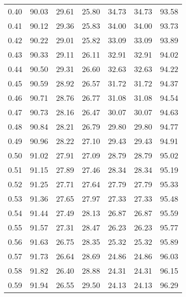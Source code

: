 \begin{tabular}{|c|c|c|c|c|c|c|}
      0.40 &     90.03 &     29.61 &      25.80 &   34.73 &      34.73 &         93.58 \\
      0.41 &     90.12 &     29.36 &      25.83 &   34.00 &      34.00 &         93.73 \\
      0.42 &     90.22 &     29.01 &      25.82 &   33.09 &      33.09 &         93.89 \\
      0.43 &     90.33 &     29.11 &      26.11 &   32.91 &      32.91 &         94.02 \\
      0.44 &     90.50 &     29.31 &      26.60 &   32.63 &      32.63 &         94.22 \\
      0.45 &     90.59 &     28.92 &      26.57 &   31.72 &      31.72 &         94.37 \\
      0.46 &     90.71 &     28.76 &      26.77 &   31.08 &      31.08 &         94.54 \\
      0.47 &     90.73 &     28.16 &      26.47 &   30.07 &      30.07 &         94.63 \\
      0.48 &     90.84 &     28.21 &      26.79 &   29.80 &      29.80 &         94.77 \\
      0.49 &     90.96 &     28.22 &      27.10 &   29.43 &      29.43 &         94.91 \\
      0.50 &     91.02 &     27.91 &      27.09 &   28.79 &      28.79 &         95.02 \\
      0.51 &     91.15 &     27.89 &      27.46 &   28.34 &      28.34 &         95.19 \\
      0.52 &     91.25 &     27.71 &      27.64 &   27.79 &      27.79 &         95.33 \\
      0.53 &     91.36 &     27.65 &      27.97 &   27.33 &      27.33 &         95.48 \\
      0.54 &     91.44 &     27.49 &      28.13 &   26.87 &      26.87 &         95.59 \\
      0.55 &     91.57 &     27.31 &      28.47 &   26.23 &      26.23 &         95.77 \\
      0.56 &     91.63 &     26.75 &      28.35 &   25.32 &      25.32 &         95.89 \\
      0.57 &     91.73 &     26.64 &      28.69 &   24.86 &      24.86 &         96.03 \\
      0.58 &     91.82 &     26.40 &      28.88 &   24.31 &      24.31 &         96.15 \\
      0.59 &     91.94 &     26.55 &      29.50 &   24.13 &      24.13 &         96.29 \\

\end{tabular}
